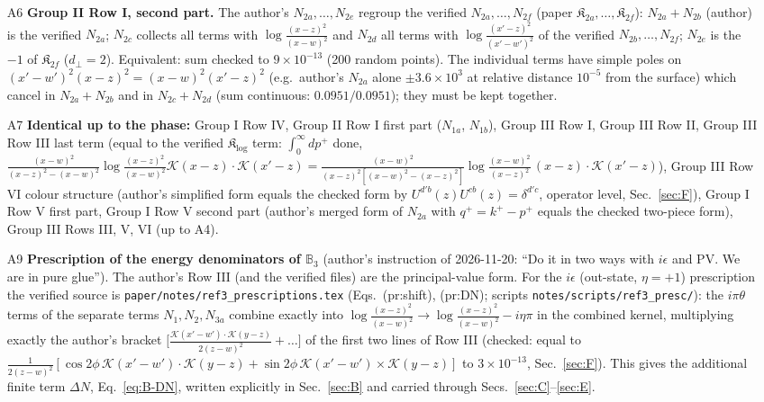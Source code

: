 \begin{itemize}
\item[A6] \textbf{Group II Row I, second part.} The author's $N_{2a},\dots,N_{2e}$ regroup the verified $N_{2a},\dots,N_{2f}$ (paper $\mathfrak{K}_{2a},\dots,\mathfrak{K}_{2f}$): $N_{2a}+N_{2b}$ (author) is the verified $N_{2a}$; $N_{2c}$ collects all terms with $\log\frac{(x-z)^{2}}{(x-w)^{2}}$ and $N_{2d}$ all terms with $\log\frac{(x'-z)^{2}}{(x'-w')^{2}}$ of the verified $N_{2b},\dots,N_{2f}$; $N_{2e}$ is the $-1$ of $\mathfrak{K}_{2f}$ ($d_{\perp}=2$). Equivalent: sum checked to $9\times10^{-13}$ (200 random points). The individual terms have simple poles on $(x'-w')^{2}(x-z)^{2}=(x-w)^{2}(x'-z)^{2}$ (e.g.\ author's $N_{2a}$ alone $\pm3.6\times10^{3}$ at relative distance $10^{-5}$ from the surface) which cancel in $N_{2a}+N_{2b}$ and in $N_{2c}+N_{2d}$ (sum continuous: $0.0951/0.0951$); they must be kept together.
\item[A7] \textbf{Identical up to the phase:} Group I Row IV, Group II Row I first part ($N_{1a}$, $N_{1b}$), Group III Row I, Group III Row II, Group III Row III last term (equal to the verified $\mathfrak{K}_{\log}$ term: $\int_{0}^{\infty}dp^{+}$ done, $\frac{(x-w)^{2}}{(x-z)^{2}-(x-w)^{2}}\log\frac{(x-z)^{2}}{(x-w)^{2}}\mathcal{K}(x-z)\cdot\mathcal{K}(x'-z)=\frac{(x-w)^{2}}{(x-z)^{2}[(x-w)^{2}-(x-z)^{2}]}\log\frac{(x-w)^{2}}{(x-z)^{2}}\,(x-z)\cdot\mathcal{K}(x'-z)$), Group III Row VI colour structure (author's simplified form equals the checked form by $U^{d'b}(z)U^{cb}(z)=\delta^{d'c}$, operator level, Sec.~\ref{sec:F}), Group I Row V first part, Group I Row V second part (author's merged form of $N_{2a}$ with $q^{+}=k^{+}-p^{+}$ equals the checked two-piece form), Group III Rows III, V, VI (up to A4).
\item[A9] \textbf{Prescription of the energy denominators of $\mathbb{B}_{3}$} (author's instruction of 2026-11-20: ``Do it in two ways with $i\epsilon$ and PV. We are in pure glue''). The author's Row III (and the verified files) are the principal-value form. For the $i\epsilon$ (out-state, $\eta=+1$) prescription the verified source is \texttt{paper/notes/ref3\_prescriptions.tex} (Eqs.~(pr:shift), (pr:DN); scripts \texttt{notes/scripts/ref3\_presc/}): the $i\pi\theta$ terms of the separate terms $N_{1},N_{2},N_{3a}$ combine exactly into $\log\frac{(x-z)^{2}}{(x-w)^{2}}\to\log\frac{(x-z)^{2}}{(x-w)^{2}}-i\eta\pi$ in the combined kernel, multiplying exactly the author's bracket $\big[\frac{\mathcal{K}(x'-w')\cdot\mathcal{K}(y-z)}{2(z-w)^{2}}+\dots\big]$ of the first two lines of Row III (checked: equal to $\frac{1}{2(z-w)^{2}}[\cos2\phi\,\mathcal{K}(x'-w')\cdot\mathcal{K}(y-z)+\sin2\phi\,\mathcal{K}(x'-w')\times\mathcal{K}(y-z)]$ to $3\times10^{-13}$, Sec.~\ref{sec:F}). This gives the additional finite term $\Delta N$, Eq.~\eqref{eq:B-DN}, written explicitly in Sec.~\ref{sec:B} and carried through Secs.~\ref{sec:C}--\ref{sec:E}.

\end{itemize}
